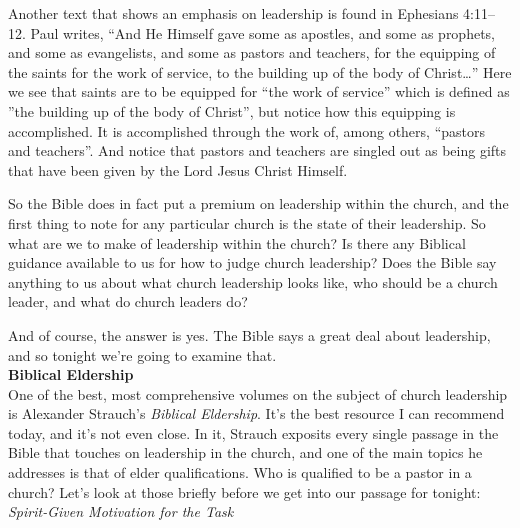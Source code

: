 \documentclass[letterpaper, 12pt]{article}
\begin{document}
    Another text that shows an emphasis on leadership is found in
    Ephesians 4:11--12. Paul writes, ``And He Himself gave some as
    apostles, and some as prophets, and some as evangelists, and some as
    pastors and teachers, for the equipping of the saints for the work
    of service, to the building up of the body of Christ\ldots'' Here we
    see that saints are to be equipped for ``the work of service'' which
    is defined as ''the building up of the body of Christ'', but notice
    how this equipping is accomplished. It is accomplished through the
    work of, among others, ``pastors and teachers''. And notice that
    pastors and teachers are singled out as being gifts that have been
    given by the Lord Jesus Christ Himself.

    So the Bible does in fact put a premium on leadership within the
    church, and the first thing to note for any particular church is the
    state of their leadership. So what are we to make of leadership
    within the church? Is there any Biblical guidance available to us
    for how to judge church leadership? Does the Bible say anything to
    us about what church leadership looks like, who should be a church
    leader, and what do church leaders do? 

    And of course, the answer is yes. The Bible says a great deal about
    leadership, and so tonight we're going to examine that. \\

    \noindent \textbf{Biblical Eldership} \\

    One of the best, most comprehensive volumes on the subject of church
    leadership is Alexander Strauch's \emph{Biblical Eldership}. It's
    the best resource I can recommend today, and it's not even close. In
    it, Strauch exposits every single passage in the Bible that touches
    on leadership in the church, and one of the main topics he addresses
    is that of elder qualifications. Who is qualified to be a pastor in
    a church? Let's look at those briefly before we get into our passage
    for tonight: \\

    \noindent \emph{Spirit-Given Motivation for the Task} \\
\end{document}
